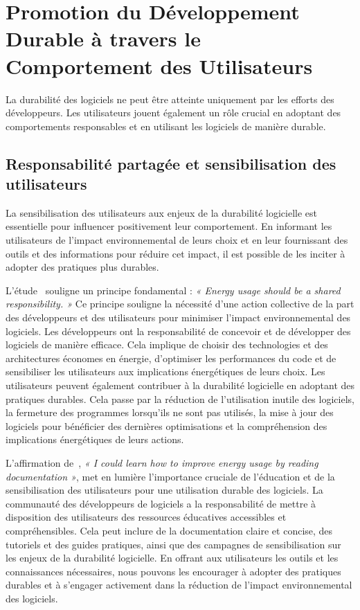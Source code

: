 
\section{Promotion du Développement Durable à travers le Comportement des Utilisateurs}
\label{sec:comportement-utilisateurs}


La durabilité des logiciels ne peut être atteinte uniquement par les efforts des développeurs. Les utilisateurs jouent également un rôle crucial en adoptant des comportements responsables et en utilisant les logiciels de manière durable.

\subsection{Responsabilité partagée et sensibilisation des utilisateurs}
La sensibilisation des utilisateurs aux enjeux de la durabilité logicielle est essentielle pour influencer positivement leur comportement. En informant les utilisateurs de l'impact environnemental de leurs choix et en leur fournissant des outils et des informations pour réduire cet impact, il est possible de les inciter à adopter des pratiques plus durables.


L'étude~\cite{EmpiricalStudy} souligne un principe fondamental : \emph{« Energy usage should be a shared responsibility. »} Ce principe souligne la nécessité d'une action collective de la part des développeurs et des utilisateurs pour minimiser l'impact environnemental des logiciels. Les développeurs ont la responsabilité de concevoir et de développer des logiciels de manière efficace. Cela implique de choisir des technologies et des architectures économes en énergie, d'optimiser les performances du code et de sensibiliser les utilisateurs aux implications énergétiques de leurs choix. Les utilisateurs peuvent également contribuer à la durabilité logicielle en adoptant des pratiques durables. Cela passe par la réduction de l'utilisation inutile des logiciels, la fermeture des programmes lorsqu'ils ne sont pas utilisés, la mise à jour des logiciels pour bénéficier des dernières optimisations et la compréhension des implications énergétiques de leurs actions.


L'affirmation de~\cite{EmpiricalStudy}, \emph{« I could learn how to improve energy usage by reading documentation »}, met en lumière l'importance cruciale de l'éducation et de la sensibilisation des utilisateurs pour une utilisation durable des logiciels. La communauté des développeurs de logiciels a la responsabilité de mettre à disposition des utilisateurs des ressources éducatives accessibles et compréhensibles. Cela peut inclure de la documentation claire et concise, des tutoriels et des guides pratiques, ainsi que des campagnes de sensibilisation sur les enjeux de la durabilité logicielle. En offrant aux utilisateurs les outils et les connaissances nécessaires, nous pouvons les encourager à adopter des pratiques durables et à s'engager activement dans la réduction de l'impact environnemental des logiciels.

